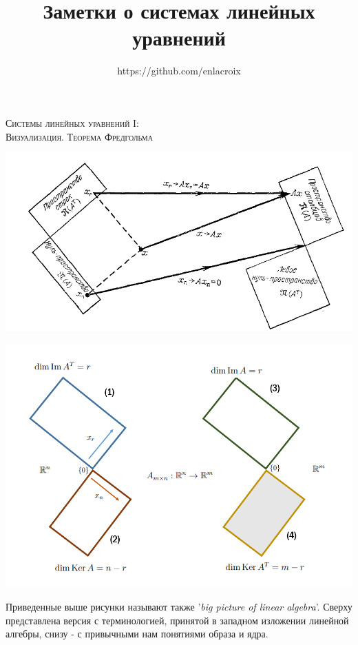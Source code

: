 \documentclass[a4paper,12pt]{article}
\begin{document}
 
\graphicspath{ {./imgs/} }
\title{Заметки о системах линейных уравнений}
\author{https://github.com/enlacroix}
\maketitle

\begin{center}
    \textsc{Системы линейных уравнений I: \\
    Визуализация. Теорема Фредгольма}
\end{center}
\begin{center}
    \includegraphics[width = 13.5 cm]{bigpict.PNG}
\end{center}
\begin{center}
    \includegraphics[width = 15 cm]{fff.PNG}
\end{center}
\newpage
Приведенные выше рисунки называют также '\textit{big picture of linear algebra}'. Сверху представлена версия с терминологией, принятой в западном изложении линейной алгебры, снизу - с привычными нам понятиями образа и ядра. \\
\end{document}
